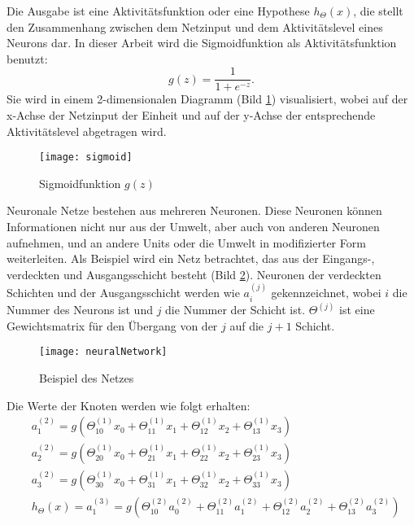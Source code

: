 Die Ausgabe ist eine Aktivit\"atsfunktion oder eine Hypothese $h_{\Theta}(x)$, die stellt den Zusammenhang zwischen dem Netzinput und dem Aktivit\"atslevel eines Neurons dar. In dieser Arbeit wird die Sigmoidfunktion als Aktivit\"ats\-funktion benutzt:
\begin{equation}
g(z)=\frac{1}{1 + e^{-z}}.
\end{equation}
Sie wird in einem 2-dimensionalen Diagramm (Bild \ref{fig:sigmoid}) visualisiert, wobei auf der x-Achse der Netzinput der Einheit und auf der y-Achse der entsprechende Aktivit\"atslevel abgetragen wird.

\begin{figure}[ht]
\centering
\texttt{[image: sigmoid]}
\caption{Sigmoidfunktion $g(z)$}
\label{fig:sigmoid}
\end{figure}

Neuronale Netze bestehen aus mehreren Neuronen. Diese Neuronen k\"onnen Informationen nicht nur aus der Umwelt, aber auch von anderen Neuronen aufnehmen, und an andere Units oder die Umwelt in modifizierter Form weiterleiten. Als Beispiel wird ein Netz betrachtet, das aus der Eingangs-, verdeckten und Ausgangsschicht besteht (Bild \ref{fig:neuNetz}). Neuronen der verdeckten Schichten und der Ausgangsschicht werden wie $a_i^{(j)}$ gekennzeichnet, wobei $i$ die Nummer des Neurons ist und $j$ die Nummer der Schicht ist. $\Theta^{(j)}$ ist eine Gewichtsmatrix f\"ur den \"Ubergang von der $j$ auf die $j+1$ Schicht.

\begin{figure}[ht]
\centering
\texttt{[image: neuralNetwork]}
\caption{Beispiel des Netzes}
\label{fig:neuNetz}
\end{figure}

Die Werte der Knoten werden wie folgt erhalten:
\begin{align*}
&a_1^{(2)} = g(\Theta_{10}^{(1)}x_0 + \Theta_{11}^{(1)}x_1 + \Theta_{12}^{(1)}x_2 + \Theta_{13}^{(1)}x_3) \\
&a_2^{(2)} = g(\Theta_{20}^{(1)}x_0 + \Theta_{21}^{(1)}x_1 + \Theta_{22}^{(1)}x_2 + \Theta_{23}^{(1)}x_3) \\
&a_3^{(2)} = g(\Theta_{30}^{(1)}x_0 + \Theta_{31}^{(1)}x_1 + \Theta_{32}^{(1)}x_2 + \Theta_{33}^{(1)}x_3) \\
&h_\Theta(x) = a_1^{(3)} = g(\Theta_{10}^{(2)}a_0^{(2)} + \Theta_{11}^{(2)}a_1^{(2)} + \Theta_{12}^{(2)}a_2^{(2)} + \Theta_{13}^{(2)}a_3^{(2)})
\end{align*}

